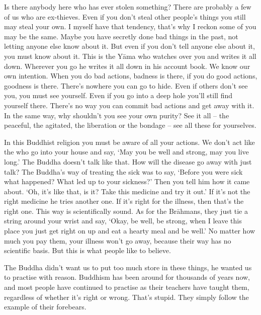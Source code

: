 Is there anybody here who has ever stolen something? There are probably a few of us who are ex-thieves. Even if you don't steal other people's things you still may steal your own. I myself have that tendency, that's why I reckon some of you may be the same. Maybe you have secretly done bad things in the past, not letting anyone else know about it. But even if you don't tell anyone else about it, you must know about it. This is the Y\=ama who watches over you and writes it all down. Wherever you go he writes it all down in his account book. We know our own intention. When you do bad actions, badness is there, if you do good actions, goodness is there. There's nowhere you can go to hide. Even if others don't see you, you must see yourself. Even if you go into a deep hole you'll still find yourself there. There's no way you can commit bad actions and get away with it. In the same way, why shouldn't you see your own purity? See it all -- the peaceful, the agitated, the liberation or the bondage -- see all these for yourselves. 

In this Buddhist religion you must be aware of all your actions. We don't act like the  who go into your house and say, `May you be well and strong, may you live long.' The Buddha doesn't talk like that. How will the disease go away with just talk? The Buddha's way of treating the sick was to say, `Before you were sick what happened? What led up to your sickness?' Then you tell him how it came about. `Oh, it's like that, is it? Take this medicine and try it out.' If it's not the right medicine he tries another one. If it's right for the illness, then that's the right one. This way is scientifically sound. As for the Br\=ahmans, they just tie a string around your wrist and say, `Okay, be well, be strong, when I leave this place you just get right on up and eat a hearty meal and be well.' No matter how much you pay them, your illness won't go away, because their way has no scientific basis. But this is what people like to believe. 

The Buddha didn't want us to put too much store in these things, he wanted us to practise with reason. Buddhism has been around for thousands of years now, and most people have continued to practise as their teachers have taught them, regardless of whether it's right or wrong. That's stupid. They simply follow the example of their forebears. 

